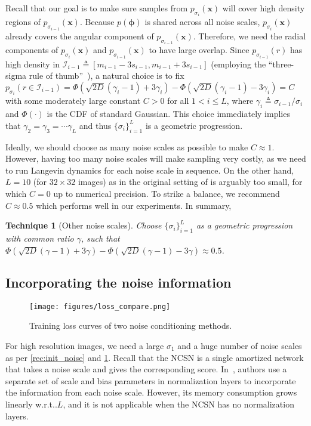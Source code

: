 \documentclass{article}
\makeatletter
\newcommand{\mcal}{\mathcal}
\newtheorem{recipe}{Technique}
\def\@onedot{\ifx\@let@token.\else.\null\fi\xspace}
\DeclareRobustCommand\onedot{\futurelet\@let@token\@onedot}
\newcommand{\bfx}{\mathbf{x}}
\newcommand{\bfphi}{{\boldsymbol{\phi}}}
\def\wrt{w.r.t\onedot}
\makeatother
\begin{document}
Recall that our goal is to make sure samples from $p_{\sigma_i}(\bfx)$ will cover high density regions of $p_{\sigma_{i-1}}(\bfx)$. Because $p(\bfphi)$ is shared across all noise scales, $p_{\sigma_i}(\bfx)$ already covers the angular component of $p_{\sigma_{i-1}}(\bfx)$. Therefore, we need the radial components of $p_{\sigma_i}(\bfx)$ and $p_{\sigma_{i-1}}(\bfx)$ to have large overlap. Since $p_{\sigma_{i-1}}(r)$ has high density in $\mcal{I}_{i-1} \triangleq [m_{i-1} - 3s_{i-1}, m_{i-1} + 3s_{i-1}]$ (employing the ``three-sigma rule of thumb''~\cite{grafarend2006linear}), a natural choice is to fix $p_{\sigma_{i}}(r \in \mcal{I}_{i-1}) = \Phi(\sqrt{2D}(\gamma_i - 1) + 3\gamma_i) - \Phi(\sqrt{2D}(\gamma_i - 1) - 3\gamma_i) = C$ with some moderately large constant $C > 0$ for all $1 < i \leq L$, where $\gamma_i \triangleq \sigma_{i-1}/\sigma_i$ and $\Phi(\cdot)$ is the CDF of standard Gaussian. This choice immediately implies that $\gamma_2 = \gamma_3 =\cdots \gamma_L$ and thus $\{\sigma_i\}_{i=1}^L$ is a geometric progression. 


Ideally, we should choose as many noise scales as possible to make $C\approx 1$. However, having too many noise scales will make sampling very costly, as we need to run Langevin dynamics for each noise scale in sequence. On the other hand, $L=10$ (for $32\times 32$ images) as in the original setting of \cite{song2019generative} is arguably too small, for which $C=0$ up to numerical precision. To strike a balance, we recommend $C \approx 0.5$ which performs well in our experiments. In summary,
\begin{recipe}[Other noise scales]\label{rec:noise_levels}
    Choose $\{\sigma_i\}_{i=1}^L$ as a geometric progression with common ratio $\gamma$, such that $\Phi(\sqrt{2D}(\gamma - 1) + 3\gamma) - \Phi(\sqrt{2D}(\gamma - 1) - 3\gamma) \approx 0.5$.
\end{recipe}





\subsection{Incorporating the noise information}\label{sec:cond}
\begin{wrapfigure}[11]{r}{0.35\textwidth}
    \centering
    \vspace{-1.8em}
    \hspace{-1em}\texttt{[image: figures/loss\_compare.png]}
    \caption{Training loss curves of two noise conditioning methods. }
    \label{fig:loss_compare}
\end{wrapfigure}
For high resolution images, we need a large $\sigma_1$ and a huge number of noise scales as per \cref{rec:init_noise} and \ref{rec:noise_levels}. Recall that the NCSN is a single amortized network that takes a noise scale and gives the corresponding score.
In~\cite{song2019generative}, authors use a separate set of scale and bias parameters in normalization layers to incorporate the information from each noise scale. However, its memory consumption grows linearly \wrt $L$, and it is not applicable when the NCSN has no normalization layers.
\end{document}
